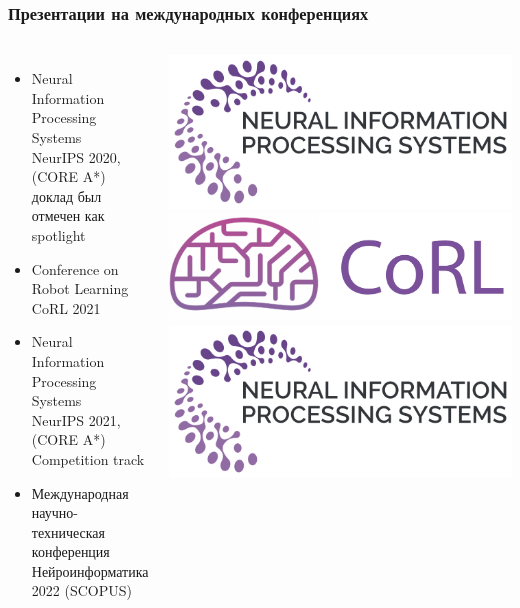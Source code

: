 \begin{frame}[t,allowframebreaks]
\frametitle{Презентации на международных конференциях}
\vspace{20pt}
\setlength{\leftmargini}{0cm}


\begin{columns}

\begin{itemize}
\setlength\itemsep{1em}
    \item[] {\color{orange}Neural Information Processing Systems}\\
    NeurIPS 2020, (CORE A*)\\
    доклад был отмечен как spotlight
    \item[] {\color{orange}Conference on Robot Learning}\\
    CoRL 2021
    \item[] {\color{orange}Neural Information Processing Systems}\\
    NeurIPS 2021, (CORE A*)\\
    Competition track
    \item[] Международная научно-техническая конференция Нейроинформатика 2022 (SCOPUS)
\end{itemize} 
\includegraphics[width=1\linewidth]{Presentation/images/logo/neurips.png}
\includegraphics[width=1\linewidth]{Presentation/images/logo/corl.png}
\includegraphics[width=1\linewidth]{Presentation/images/logo/neurips.png}

\end{columns}
\end{frame}
